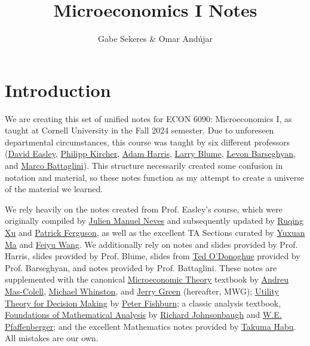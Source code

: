 \documentclass[12pt]{article}
\title{Microeconomics I Notes}
\author{Gabe Sekeres \& Omar And\'{u}jar}
\begin{document}
\maketitle

\tableofcontents

\newpage

\section*{Introduction}

We are creating this set of unified notes for ECON 6090: Microeconomics I, as taught at Cornell University in the Fall 2024 semester. Due to unforeseen departmental circumstances, this course was taught by six different professors (\href{https://easley.economics.cornell.edu/}{David Easley}, \href{https://philippkircher.com/}{Philipp Kircher}, \href{https://adamharris.phd/}{Adam Harris}, \href{https://sites.santafe.edu/~leb/}{Larry Blume}, \href{https://barseghyan.economics.cornell.edu/}{Levon Barseghyan}, and \href{https://www.mbattaglini.com/}{Marco Battaglini}). This structure necessarily created some confusion in notation and material, so these notes function as my attempt to create a universe of the material we learned.

We rely heavily on the notes created from Prof. Easley's course, which were originally compiled by \href{https://julienneves.com/}{Julien Manuel Neves} and subsequently updated by \href{https://ruqing-xu.github.io/}{Ruqing Xu} and \href{https://economics.cornell.edu/patrick-ferguson}{Patrick Ferguson}, as well as the excellent TA Sections curated by \href{https://economics.cornell.edu/yuxuan-ma}{Yuxuan Ma} and \href{https://dyson.cornell.edu/programs/graduate/graduate-student-directory/}{Feiyu Wang}. We additionally rely on notes and slides provided by Prof. Harris, slides provided by Prof. Blume, slides from \href{https://blogs.cornell.edu/odonoghue/}{Ted O'Donoghue} provided by Prof. Barseghyan, and notes provided by Prof. Battaglini. These notes are supplemented with the canonical \href{https://global.oup.com/academic/product/microeconomic-theory-9780195073409?cc=us&lang=en&}{Microeconomic Theory} textbook by \href{https://www.upf.edu/web/andreu-mas-colell}{Andreu Mas-Colell}, \href{https://mitsloan.mit.edu/faculty/directory/michael-whinston}{Michael Whinston}, and \href{https://www.hbs.edu/faculty/Pages/profile.aspx?facId=6466}{Jerry Green} (hereafter, MWG); \href{https://www.semanticscholar.org/paper/Utility-theory-for-decision-making-Fishburn/905a24a912171436e0abd3b5f1fdcb963e6f852f}{Utility Theory for Decision Making} by \href{https://en.wikipedia.org/wiki/Peter_C._Fishburn}{Peter Fishburn}; a classic analysis textbook, \href{https://store.doverpublications.com/products/9780486477664}{Foundations of Mathematical Analysis} by \href{https://condor.depaul.edu/~rjohnson/}{Richard Johnsonbaugh} and \href{https://www.mathgenealogy.org/id.php?id=12494}{W.E. Pfaffenberger}; and the excellent Mathematics notes provided by \href{https://www.takumahabu.com/Economics}{Takuma Habu}. All mistakes are our own.
\end{document}
